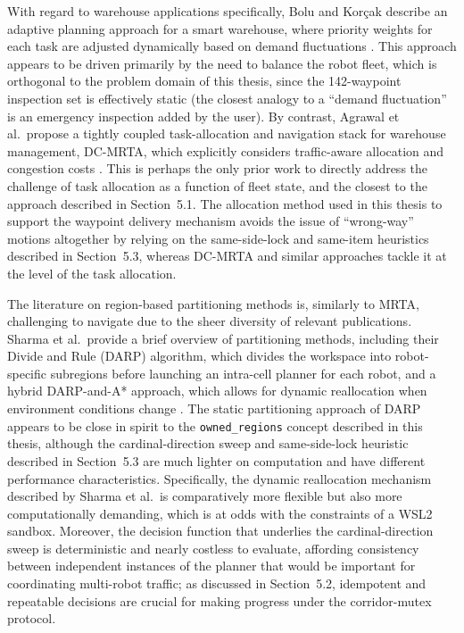 With regard to warehouse applications specifically, Bolu and Kor\c{c}ak describe an adaptive planning approach for a smart warehouse, where priority weights for each task are adjusted dynamically based on demand fluctuations \cite{bolu2021adaptive}. This approach appears to be driven primarily by the need to balance the robot fleet, which is orthogonal to the problem domain of this thesis, since the 142-waypoint inspection set is effectively static (the closest analogy to a ``demand fluctuation'' is an emergency inspection added by the user). By contrast, Agrawal et al.\ propose a tightly coupled task-allocation and navigation stack for warehouse management, DC-MRTA, which explicitly considers traffic-aware allocation and congestion costs \cite{agrawal2022dcmrta}. This is perhaps the only prior work to directly address the challenge of task allocation as a function of fleet state, and the closest to the approach described in Section~5.1. The allocation method used in this thesis to support the waypoint delivery mechanism avoids the issue of ``wrong-way'' motions altogether by relying on the same-side-lock and same-item heuristics described in Section~5.3, whereas DC-MRTA and similar approaches tackle it at the level of the task allocation.

The literature on region-based partitioning methods is, similarly to MRTA, challenging to navigate due to the sheer diversity of relevant publications. Sharma et al.\ provide a brief overview of partitioning methods, including their Divide and Rule (DARP) algorithm, which divides the workspace into robot-specific subregions before launching an intra-cell planner for each robot, and a hybrid DARP-and-A* approach, which allows for dynamic reallocation when environment conditions change \cite{sharma2026darp}. The static partitioning approach of DARP appears to be close in spirit to the \texttt{owned\_regions} concept described in this thesis, although the cardinal-direction sweep and same-side-lock heuristic described in Section~5.3 are much lighter on computation and have different performance characteristics. Specifically, the dynamic reallocation mechanism described by Sharma et al.\ is comparatively more flexible but also more computationally demanding, which is at odds with the constraints of a WSL2 sandbox. Moreover, the decision function that underlies the cardinal-direction sweep is deterministic and nearly costless to evaluate, affording consistency between independent instances of the planner that would be important for coordinating multi-robot traffic; as discussed in Section~5.2, idempotent and repeatable decisions are crucial for making progress under the corridor-mutex protocol.

